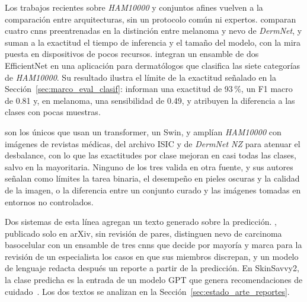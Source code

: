 Los trabajos recientes sobre \emph{HAM10000} y conjuntos afines vuelven a la comparación entre arquitecturas, sin
un protocolo común ni expertos. \textcite{kreouzi2024learning} comparan cuatro \glspl{cnn} preentrenadas en la
distinción entre melanoma y nevo de \emph{DermNet}, y suman a la exactitud el tiempo de inferencia y el tamaño del
modelo, con la mira puesta en dispositivos de pocos recursos. \textcite{aboulmira2024skinhealthmate} integran un
ensamble de dos EfficientNet en una aplicación para dermatólogos que clasifica las siete categorías de
\emph{HAM10000}. Su resultado ilustra el límite de la exactitud señalado en la
Sección~\ref{sec:marco_eval_clasif}: informan una exactitud de 93\,\%, un F1 macro de 0.81 y, en melanoma, una
sensibilidad de 0.49, y atribuyen la diferencia a las clases con pocas muestras.

\textcite{kim2025skinsavvy2} son
los únicos que usan un transformer, un Swin, y amplían \emph{HAM10000} con imágenes de revistas médicas, del archivo
ISIC y de \emph{DermNet NZ} para atenuar el desbalance, con lo que las exactitudes por clase mejoran en casi todas
las clases, salvo en la mayoritaria. Ninguno de los tres valida en otra fuente, y sus autores señalan como límites
la tarea binaria, el desempeño en pieles oscuras y la calidad de la imagen, o la diferencia entre un conjunto
curado y las imágenes tomadas en entornos no controlados.

Dos sistemas de esta línea agregan un texto generado sobre la predicción. \textcite{khan2025ensemble}, publicado
solo en arXiv, sin revisión de pares, distinguen nevo de carcinoma basocelular con un ensamble de tres \glspl{cnn} que decide
por mayoría y marca para la revisión de un especialista los casos en que sus miembros discrepan, y un modelo de
lenguaje redacta después un reporte a partir de la predicción. En SkinSavvy2, la clase predicha es la entrada de
un modelo GPT que genera recomendaciones de cuidado~\cite{kim2025skinsavvy2}. Los dos textos se analizan en la
Sección~\ref{sec:estado_arte_reportes}.

